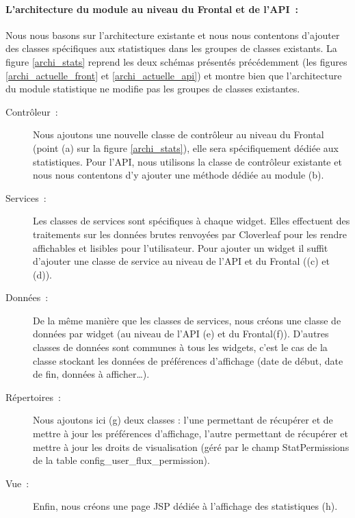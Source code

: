 			\paragraph{L'architecture du module au niveau du Frontal et de l'API~:}
			Nous nous basons sur l'architecture existante et nous nous contentons
			d'ajouter des classes spécifiques aux statistiques dans les groupes de classes
			existants. La figure \ref{archi_stats} reprend les deux schémas présentés
			précédemment (les figures \ref{archi_actuelle_front} et
			\ref{archi_actuelle_api}) et montre bien que l'architecture du module
			statistique ne modifie pas les groupes de classes existantes.
			\begin{description}
				\item[Contrôleur~:] Nous ajoutons une nouvelle classe de contrôleur au
				niveau du Frontal (point (a) sur la figure \ref{archi_stats}), elle sera
				spécifiquement dédiée aux statistiques. Pour l'API, nous utilisons la
				classe de contrôleur existante et nous nous contentons d'y ajouter une
				méthode dédiée au module (b).
				\item[Services~:] Les classes de services sont spécifiques à chaque widget.
				Elles effectuent des traitements sur les données brutes renvoyées par
				Cloverleaf pour les rendre affichables et lisibles pour l'utilisateur. Pour
				ajouter un widget il suffit d'ajouter une classe de service au niveau de
				l'API et du Frontal ((c) et (d)).
				\item[Données~:] De la même manière que les classes de services, nous créons
				une classe de données par widget (au niveau de
				l'API (e) et du Frontal(f)). D'autres classes de données sont communes
				à tous les widgets, c'est le cas de la classe stockant les données de
				préférences d'affichage (date de début, date de fin, données à
				afficher\ldots).
				\item[Répertoires~:] Nous ajoutons ici (g) deux classes : l'une permettant
				de récupérer et de mettre à jour les préférences d'affichage, l'autre
				permettant de récupérer et mettre à jour les droits de visualisation (géré
				par le champ StatPermissions de la table config\_user\_flux\_permission).
				\item[Vue~:] Enfin, nous créons une page JSP dédiée à l'affichage des
				statistiques (h).
			\end{description}
			
